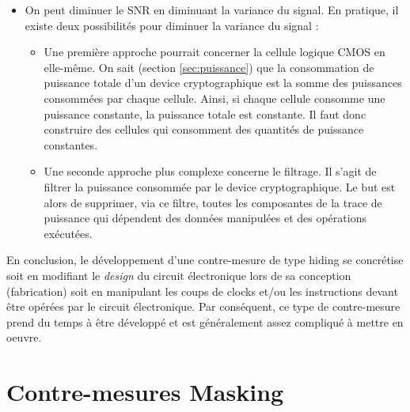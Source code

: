 \documentclass[oneside]{book}
\begin{document}
\begin{itemize}
\begin{itemize}
\item On peut diminuer le SNR en diminuant la variance du signal. En pratique, il existe deux possibilités pour diminuer la variance du signal :
\begin{itemize}
\item Une première approche pourrait concerner la cellule logique CMOS en elle-même. On sait (section \ref{sec:puissance}) que la consommation de puissance totale d'un device cryptographique est la somme des puissances consommées par chaque cellule. Ainsi, si chaque cellule consomme une puissance constante, la puissance totale est constante. Il faut donc construire des cellules qui consomment des quantités de puissance constantes.
\item Une seconde approche plus complexe concerne le filtrage. Il s'agit de filtrer la puissance consommée par le device cryptographique. Le but est alors de supprimer, via ce filtre, toutes les composantes de la trace de puissance qui dépendent des données manipulées et des opérations exécutées. \\
\end{itemize}
\end{itemize}
\end{itemize}

En conclusion, le développement d'une contre-mesure de type hiding se concrétise soit en modifiant le \textit{design} du circuit électronique lors de sa conception (fabrication) soit en manipulant les coups de clocks et/ou les instructions devant être opérées par le circuit électronique. Par conséquent, ce type de contre-mesure prend du temps à être développé et est généralement assez compliqué à mettre en oeuvre.

\section{Contre-mesures Masking}
\label{sec:masking}
\end{document}
